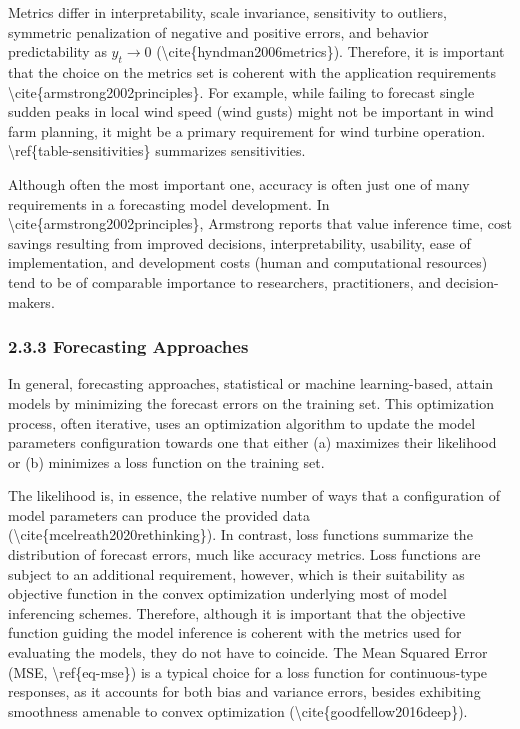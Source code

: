 \documentclass[
]{article}
\begin{document}
Metrics differ in interpretability, scale invariance, sensitivity to
outliers, symmetric penalization of negative and positive errors, and
behavior predictability as \(y_t \rightarrow 0\)
(\textbackslash cite\{hyndman2006metrics\}). Therefore, it is important
that the choice on the metrics set is coherent with the application
requirements \textbackslash cite\{armstrong2002principles\}. For
example, while failing to forecast single sudden peaks in local wind
speed (wind gusts) might not be important in wind farm planning, it
might be a primary requirement for wind turbine operation.
\textbackslash ref\{table-sensitivities\} summarizes sensitivities.

Although often the most important one, accuracy is often just one of
many requirements in a forecasting model development. In
\textbackslash cite\{armstrong2002principles\}, Armstrong reports that
value inference time, cost savings resulting from improved decisions,
interpretability, usability, ease of implementation, and development
costs (human and computational resources) tend to be of comparable
importance to researchers, practitioners, and decision-makers.

\hypertarget{header-n106}{%
\subsubsection{2.3.3 Forecasting Approaches}\label{header-n106}}

In general, forecasting approaches, statistical or machine
learning-based, attain models by minimizing the forecast errors on the
training set. This optimization process, often iterative, uses an
optimization algorithm to update the model parameters configuration
towards one that either (a) maximizes their likelihood or (b) minimizes
a loss function on the training set.

The likelihood is, in essence, the relative number of ways that a
configuration of model parameters can produce the provided data
(\textbackslash cite\{mcelreath2020rethinking\}). In contrast, loss
functions summarize the distribution of forecast errors, much like
accuracy metrics. Loss functions are subject to an additional
requirement, however, which is their suitability as objective function
in the convex optimization underlying most of model inferencing schemes.
Therefore, although it is important that the objective function guiding
the model inference is coherent with the metrics used for evaluating the
models, they do not have to coincide. The Mean Squared Error (MSE,
\textbackslash ref\{eq-mse\}) is a typical choice for a loss function
for continuous-type responses, as it accounts for both bias and variance
errors, besides exhibiting smoothness amenable to convex optimization
(\textbackslash cite\{goodfellow2016deep\}).
\end{document}
